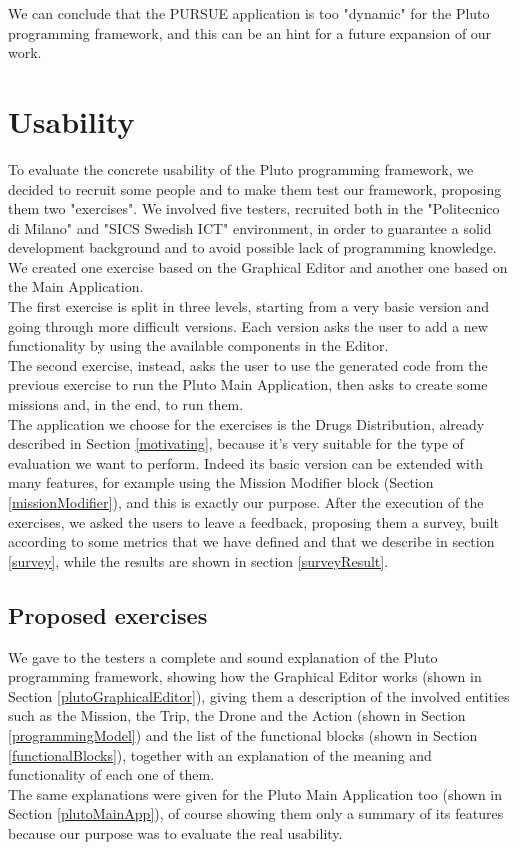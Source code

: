 We can conclude that the PURSUE application is too "dynamic" for the Pluto programming framework, and this can be an hint for a future expansion of our work.


\newpage

\section{Usability}
\label{usability}

To evaluate the concrete usability of the Pluto programming framework, we decided to recruit some people and to make them test our framework, proposing them two "exercises".
We involved five testers, recruited both in the "Politecnico di Milano" and "SICS Swedish ICT" environment, in order to guarantee a solid development background and to avoid possible lack of programming knowledge.
We created one exercise based on the Graphical Editor and another one based on the Main Application.
\\

The first exercise is split in three levels, starting from a very basic version and going through more difficult versions. Each version asks the user to add a new functionality by using the available components in the Editor.
\\
The second exercise, instead, asks the user to use the generated code from the previous exercise to run the Pluto Main Application, then asks to create some missions and, in the end, to run them.
\\

The application we choose for the exercises is the Drugs Distribution, already described in Section \ref{motivating}, because it's very suitable for the type of evaluation we want to perform.
Indeed its basic version can be extended with many features, for example using the Mission Modifier block (Section \ref{missionModifier}), and this is exactly our purpose.
After the execution of the exercises, we asked the users to leave a feedback, proposing them a survey, built according to some metrics that we have defined and that we describe in section \ref{survey}, while the results are shown in section \ref{surveyResult}.

\subsection{Proposed exercises}
\label{exercise}

We gave to the testers a complete and sound explanation of the Pluto programming framework, showing how the Graphical Editor works (shown in Section \ref{plutoGraphicalEditor}), giving them a description of the involved entities such as the Mission, the Trip, the Drone and the Action (shown in Section \ref{programmingModel}) and the list of the functional blocks (shown in Section \ref{functionalBlocks}), together with an explanation of the meaning and functionality of each one of them.
\\
The same explanations were given for the Pluto Main Application too (shown in Section \ref{plutoMainApp}), of course showing them only a summary of its features because our purpose was to evaluate the real usability.

